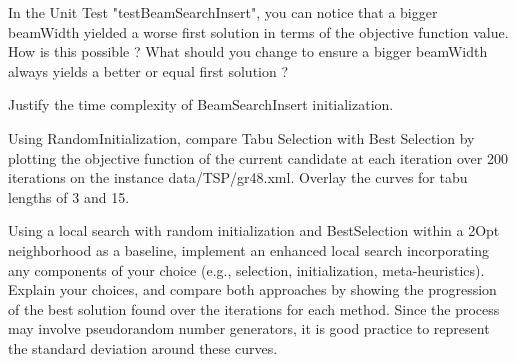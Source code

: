 \documentclass[12pt]{report}
\newcommand{\answerbox}[2]{\hfill\break\\
        \framebox[\linewidth]{\parbox[c][#1][c]{\dimexpr\linewidth-2\fboxsep-2\fboxrule}{#2}}
}
\begin{document}
\newpage


\begin{Exercise}[title={Initialization}]


\Question In the Unit Test "testBeamSearchInsert", you can notice that a bigger beamWidth yielded a worse first solution in terms of the objective function value. How is this possible ? What should you change to ensure a bigger beamWidth always yields a better or equal first solution ?
\answerbox{9cm}{
}

\Question Justify the time complexity of BeamSearchInsert initialization.
\answerbox{10cm}{
}

\end{Exercise}

\newpage

\begin{Exercise}[title={Improving the solution}]

\Question Using RandomInitialization, compare Tabu Selection with Best Selection by plotting the objective function of the current candidate at each iteration over 200 iterations on the instance data/TSP/gr48.xml. Overlay the curves for tabu lengths of 3 and 15.
\answerbox{6cm}{
}

\Question Using a local search with random initialization and BestSelection within a 2Opt neighborhood as a baseline, implement an enhanced local search incorporating any components of your choice (e.g., selection, initialization, meta-heuristics). Explain your choices, and compare both approaches by showing the progression of the best solution found over the iterations for each method. Since the process may involve pseudorandom number generators, it is good practice to represent the standard deviation around these curves.

\answerbox{10cm}{
}

\end{Exercise}
\end{document}
